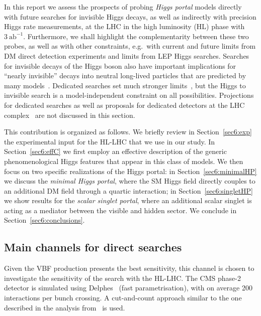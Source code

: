 \documentclass[../report.tex]{subfiles}
\begin{document}
In this report we assess the prospects of probing \emph{Higgs portal} models directly with future searches for invisible Higgs decays, as well as indirectly with precision Higgs rate measurements, at the LHC in the high luminosity (HL) phase with $3~\mathrm{ab}^{-1}$. Furthermore, we shall highlight the complementarity between these two probes, as well as with other constraints, e.g.~with current and future limits from DM direct detection experiments and limits from LEP Higgs searches. Searches for invisible decays of the Higgs boson also have important implications for ``nearly invisible'' decays into neutral long-lived particles that are predicted by many models~\cite{Curtin:2018mvb}. Dedicated searches set much stronger limits~\cite{Aad:2015uaa,ATLAS:2016jza,Aaij:2016xmb,CMS:2014hka}, but the Higgs to invisible search is a model-independent constraint on all possibilities.  Projections for dedicated searches as well as proposals for dedicated detectors at the LHC complex~\cite{Chou:2016lxi,Gligorov:2017nwh} are not discussed in this section.

This contribution is organized as follows. We briefly review in Section~\ref{sec6:exp} the experimental input for the HL-LHC that we use in our study. In Section~\ref{sec6:effC} we first employ an effective description of the generic phenomenological Higgs features that appear in this class of models. We then focus on two specific realizations of the Higgs portal: in Section~\ref{sec6:minimalHP} we discuss the \emph{minimal Higgs portal}, where the SM Higgs field directly couples to an additional DM field through a quartic interaction; in Section~\ref{sec6:singletHP} we show results for the \emph{scalar singlet portal}, where an additional scalar singlet is acting as a mediator between the visible and hidden sector. We conclude in Section~\ref{sec6:conclusions}.


\subsection{Main channels for direct searches}\label{sec:expinp}

Given the VBF production presents the best sensitivity, this channel is chosen to investigate the sensitivity of the search with the HL-LHC. The CMS phase-2 detector is simulated using Delphes~\cite{deFavereau:2013fsa} (fast parametrisation), with on average 200 interactions per bunch crossing.  A
cut-and-count approach similar to the one described in the analysis from~\cite{Sirunyan:2018owy} is used.
\end{document}
